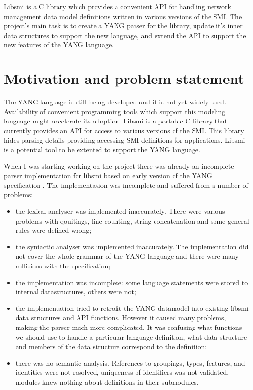 \documentclass[conference]{IEEEtran}
\begin{document}
Libsmi is a C library which provides a convenient API for handling network management data model definitions written in various versions of the SMI. The project's main task is to create a YANG parser for the library, update it's inner data structures to support the new language, and extend the API to support the new features of the YANG language.

\section{Motivation and problem statement}
The YANG language is still being developed and it is not yet widely used. Availability of convenient programming tools which support this modeling language might accelerate its adoption. Libsmi is  a portable C library that currently provides an API for access to various versions of the SMI. This library hides parsing details providing accessing SMI definitions for applications. Libsmi is a potential tool to be extented to support the YANG language. 

When I was starting working on the project there was already an incomplete parser implementation for libsmi based on early version of the YANG specification  \cite{bib2}. The implementation was incomplete and suffered from a number of problems: 
\begin{itemize}
	\item the lexical analyser was implemented inaccurately. There were various problems with qouitings, line counting, string concatenation and some general rules were defined wrong;
	\item the syntactic analyser was implemented inaccurately. The implementation did not cover the whole grammar of the YANG language and there were many collisions with the specification;
	\item the implementation was incomplete: some language statements were stored to internal datastructures, others were not;
	\item the implementation tried to retrofit the YANG datamodel into existing libsmi data structures and API functions. However it caused many problems, making the parser much more complicated. It was confusing what functions we should use to handle a particular language definition, what data structure and members of the data structure correspond to the definition;
	\item there was no semantic analysis. References to groupings, types, features, and identities were not resolved, uniqueness of identifiers was not validated, modules knew nothing about definitions in their submodules.
\end{itemize}
\end{document}
